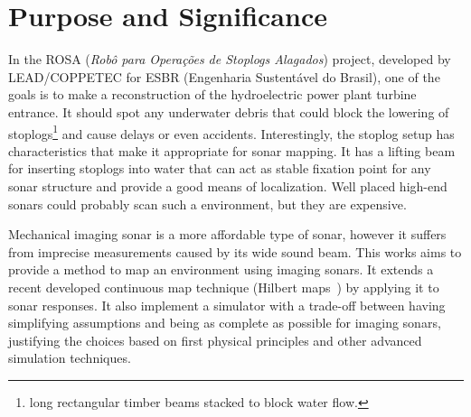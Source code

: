 \section{Purpose and Significance}



In the ROSA (\textit{Robô para Operações de Stoplogs Alagados}) project,
developed by LEAD/COPPETEC for ESBR (Engenharia Sustentável do Brasil), one of
the goals is to make a reconstruction of the hydroelectric power plant turbine
entrance. It should spot any underwater debris that could block the lowering of
stoplogs\footnote{long rectangular timber beams stacked to block water
flow.} and cause delays or even accidents.
Interestingly, the stoplog setup has characteristics that make it appropriate
for sonar mapping. It has a lifting beam for inserting stoplogs into
water that can act as stable fixation point for any sonar structure and
provide a good means of localization. Well placed high-end sonars could probably
scan such a environment, but they are expensive.

Mechanical imaging sonar is a more affordable type of sonar, however it suffers
from imprecise measurements caused by its wide sound beam. This works aims to
provide a method to map an environment using imaging sonars. It extends a recent
developed continuous map technique (Hilbert maps~\cite{ramos2016hilbert}) by
applying it to sonar responses. It also implement a simulator with a trade-off
between having simplifying assumptions and being as complete as possible for
imaging sonars, justifying the choices based on first physical principles and
other advanced simulation techniques.


% 
% 
